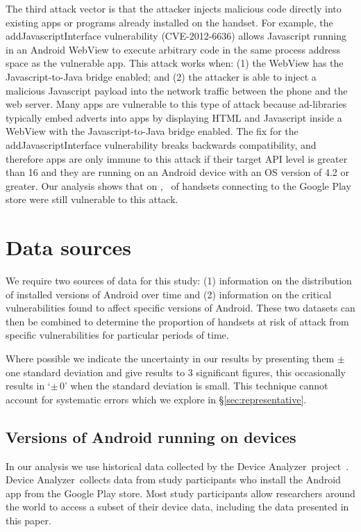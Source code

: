 \documentclass{llncs}
\let\OldTodo\todo
\renewcommand{\todo}{\OldTodo}%
\newcommand{\todolater}[1]{\todo{#1}}%
\newcommand{\da}{Device Analyzer}
\begin{document}
The third attack vector is that the attacker injects malicious code directly into existing apps or programs already installed on the handset. 
For example, the addJavascriptInterface vulnerability (CVE-2012-6636) allows Javascript running in an Android WebView to execute arbitrary code in the same process address space as the vulnerable app.
This attack works when: (1) the WebView has the Javascript-to-Java bridge enabled; and (2) the attacker is able to inject a malicious Javascript payload into the network traffic between the phone and the web server. 
Many apps are vulnerable to this type of attack because ad-libraries typically embed adverts into apps by displaying HTML and Javascript inside a WebView with the Javascript-to-Java bridge enabled. 
The fix for the addJavascriptInterface vulnerability breaks backwards compatibility, and therefore apps are only immune to this attack if their target API level is greater than 16 and they are running on an Android device with an OS version of 4.2 or greater.
Our analysis shows that on \daGPAPISeventeenLaterDate, \daGPAPISeventeenEarlierProportion\ of handsets connecting to the Google Play store were still vulnerable to this attack.


\section{Data sources}
\label{sec:background}

We require two sources of data for this study: (1) information on the distribution of installed versions of Android over time and (2) information on the critical vulnerabilities found to affect specific versions of Android.
These two datasets can then be combined to determine the proportion of handsets at risk of attack from specific vulnerabilities for particular periods of time.

Where possible we indicate the uncertainty in our results by presenting them $\pm$ one standard deviation and give results to 3 significant figures, this occasionally results in `$\pm\, 0$' when the standard deviation is small.\todolater{Do we want to use the 95 percentile instead}
This technique cannot account for systematic errors which we explore in \S\ref{sec:representative}.

\subsection{Versions of Android running on devices}

In our analysis we use historical data collected by the \da\ project~\cite{Wagner2013}.
\da\ collects data from study participants who install the Android app from the Google Play store.
Most study participants allow researchers around the world to access a subset of their device data, including the data presented in this paper.
\end{document}
